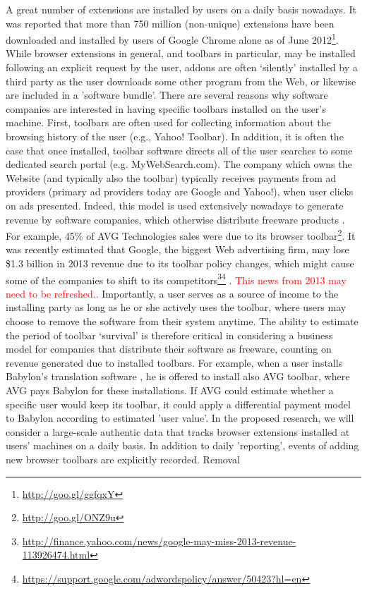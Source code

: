 \documentclass[11pt,oneside]{book}
\begin{document}
A great number of extensions are installed by users on a daily basis nowadays. It was reported that more than 750 million (non-unique) extensions have been downloaded and installed by users of Google Chrome alone as of June 2012\footnote{\url{http://goo.gl/ggfqxY}}. While browser extensions in general, and toolbars in particular, may be installed following an explicit request by the user, addons are often `silently' installed by a third party as the user downloads some other program from the Web, or likewise are included in a 'software bundle'. There are several reasons why software companies are interested in having specific toolbars installed on the user's machine. First, toolbars are often used for collecting information about the browsing history of the user (e.g., Yahoo! Toolbar). In addition, it is often the case that once installed, toolbar software directs all of the user searches to some dedicated search portal (e.g. MyWebSearch.com). 
The company which owns the Website (and typically also the toolbar) typically receives payments from ad providers (primary ad providers today are Google and Yahoo!), when user clicks on ads presented. Indeed, this model is used extensively nowadays to generate revenue by software companies, which otherwise distribute freeware products \citep{leontiadis2012don}. For example, 45\% of AVG Technologies sales were due to its browser toolbar\footnote{\url{http://goo.gl/ONZ9u}}.  It was recently estimated that Google, the biggest Web advertising firm, may lose \$1.3 billion in 2013 revenue  due to its toolbar policy changes, which might cause some of the companies to shift to its competitors\footnote{\url{http://finance.yahoo.com/news/google-may-miss-2013-revenue-113926474.html}}\footnote{\url{https://support.google.com/adwordspolicy/answer/50423?hl=en}} . \textcolor{red}{This news from 2013 may need to be refreshed..} \iffalse Importantly, a user serves as a source of income to the installing party as long as he or she actively uses the toolbar, where users may choose to remove the software from their system anytime. The ability to estimate the period of toolbar ‘survival’ is therefore critical in considering a business model for companies that distribute their software as freeware, counting on revenue generated due to installed toolbars. For example, when a user installs Babylon's translation software , he is offered to install also AVG toolbar, where AVG pays Babylon for these installations. If AVG could estimate whether a specific user would keep its toolbar, it could apply a differential payment model to Babylon according to estimated 'user value'.  In the proposed research, we will consider a large-scale authentic data that tracks browser extensions installed at users' machines on a daily basis. In addition to daily 'reporting', events of adding new browser toolbars are explicitly recorded. Removal
\end{document}
